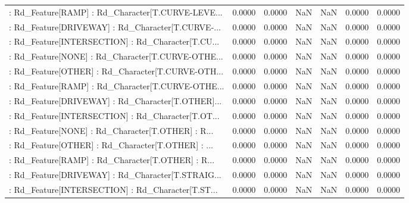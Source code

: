 \begin{longtable}{p{4cm}cccccc}
 : Rd\_Feature[RAMP] : Rd\_Character[T.CURVE-LEVE... &            0.0000 &            0.0000 &     NaN &          NaN &             0.0000 &            0.0000 \\
 : Rd\_Feature[DRIVEWAY] : Rd\_Character[T.CURVE-... &            0.0000 &            0.0000 &     NaN &          NaN &             0.0000 &            0.0000 \\
 : Rd\_Feature[INTERSECTION] : Rd\_Character[T.CU... &            0.0000 &            0.0000 &     NaN &          NaN &             0.0000 &            0.0000 \\
 : Rd\_Feature[NONE] : Rd\_Character[T.CURVE-OTHE... &            0.0000 &            0.0000 &     NaN &          NaN &             0.0000 &            0.0000 \\
 : Rd\_Feature[OTHER] : Rd\_Character[T.CURVE-OTH... &            0.0000 &            0.0000 &     NaN &          NaN &             0.0000 &            0.0000 \\
 : Rd\_Feature[RAMP] : Rd\_Character[T.CURVE-OTHE... &            0.0000 &            0.0000 &     NaN &          NaN &             0.0000 &            0.0000 \\
 : Rd\_Feature[DRIVEWAY] : Rd\_Character[T.OTHER]... &            0.0000 &            0.0000 &     NaN &          NaN &             0.0000 &            0.0000 \\
 : Rd\_Feature[INTERSECTION] : Rd\_Character[T.OT... &            0.0000 &            0.0000 &     NaN &          NaN &             0.0000 &            0.0000 \\
 : Rd\_Feature[NONE] : Rd\_Character[T.OTHER] : R... &            0.0000 &            0.0000 &     NaN &          NaN &             0.0000 &            0.0000 \\
 : Rd\_Feature[OTHER] : Rd\_Character[T.OTHER] : ... &            0.0000 &            0.0000 &     NaN &          NaN &             0.0000 &            0.0000 \\
 : Rd\_Feature[RAMP] : Rd\_Character[T.OTHER] : R... &            0.0000 &            0.0000 &     NaN &          NaN &             0.0000 &            0.0000 \\
 : Rd\_Feature[DRIVEWAY] : Rd\_Character[T.STRAIG... &            0.0000 &            0.0000 &     NaN &          NaN &             0.0000 &            0.0000 \\
 : Rd\_Feature[INTERSECTION] : Rd\_Character[T.ST... &            0.0000 &            0.0000 &     NaN &          NaN &             0.0000 &            0.0000 \\

\end{longtable}

